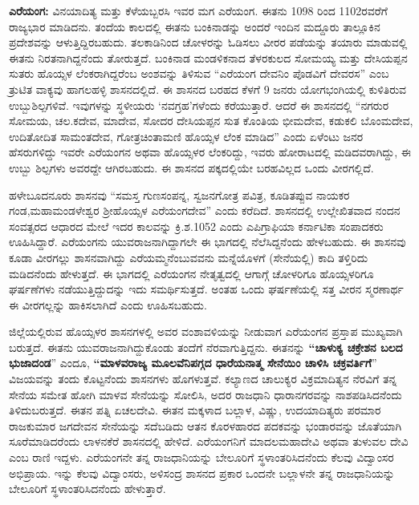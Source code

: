 \textbf{ಎರೆಯಂಗ:} ವಿನಯಾದಿತ್ಯ ಮತ್ತು ಕೆಳೆಯಬ್ಬರಸಿ ಇವರ ಮಗ ಎರೆಯಂಗ. ಈತನು 1098 ರಿಂದ 1102ರವರೆಗೆ ರಾಜ್ಯಭಾರ ಮಾಡಿದನು. ತಂದೆಯ ಕಾಲದಲ್ಲಿ ಈತನು ಬಂಕಿನಾಡನ್ನು ಅಂದರೆ ಇಂದಿನ ಮದ್ದೂರು ತಾಲ್ಲೂಕಿನ ಪ್ರದೇಶವನ್ನು ಆಳುತ್ತಿದ್ದಿರಬಹುದು. ತಲಕಾಡಿನಿಂದ ಚೋಳರನ್ನು ಓಡಿಸಲು ವೀರರ ಪಡೆಯನ್ನು ತಯಾರು ಮಾಡುವಲ್ಲಿ ಈತನು ನಿರತನಾಗಿದ್ದನೆಂದು ತೋರುತ್ತದೆ. ಬಂಕಿನಾಡ ಮಂಡಳಿಕನಾದ ತೆಳರಕುಲದ ಸೋಮಯ್ಯ ಮತ್ತು ದೇಸಿಯಪ್ಪನ ಸುತರು ಹೊಯ್ಸಳ ಲೆಂಕರಾಗಿದ್ದರೆಂಬ ಅಂಶವನ್ನು ತಿಳಿಸುವ “ಎರೆಯಂಗ ದೇವನಿಂ ಪೊಡವಿಗೆ ದೇವರಸ” ಎಂಬ ತ್ರುಟಿತ ವಾಕ್ಯವು ಹಾಗಲಹಳ್ಳಿ ಶಾಸನದಲ್ಲಿದೆ. ಈ ಶಾಸನದ ಬರಹದ ಕೆಳಗೆ 9 ಜನರು ಯೋಗಭಂಗಿಯಲ್ಲಿ ಕುಳಿತಿರುವ ಉಬ್ಬುಶಿಲ್ಪಗಳಿವೆ. ಇವುಗಳನ್ನು ಸ್ಥಳೀಯರು ‘ನವಗ್ರಹ’ಗಳೆಂದು ಕರೆಯುತ್ತಾರೆ. ಆದರೆ ಈ ಶಾಸನದಲ್ಲಿ “ನಗರುರ ಸೋಮಯ, ಚಲ.ಕದೇವ, ಮಾದೇವ, ಸೋದರ ದೇಸಿಯಪ್ಪನ ಸುತ ಕೊಂತಿಯ ಭೀಮದೇವ, ಕಡುಕಲಿ ಬೊಂಮದೇವ, ಉದಿತೋದಿತ ಸಾಮಂತದೇವ, ಗೋತ್ರಚಿಂತಾಮಣಿ ಹೊಯ್ಸಳ ಲೆಂಕ ಮಾಡಿದ” ಎಂದು ಏಳೆಂಟು ಜನರ ಹೆಸರುಗಳಿದ್ದು ಇವರೇ ಎರೆಯಂಗನ ಅಥವಾ ಹೊಯ್ಸಳರ ಲೆಂಕರಿದ್ದು, ಇವರು ಹೋರಾಟದಲ್ಲಿ ಮಡಿದವರಾಗಿದ್ದು, ಈ ಉಬ್ಬು ಶಿಲ್ಪಗಳು ಅವರದ್ದೇ ಆಗಿರಬಹುದು. ಈ ಶಾಸನದ ಪಕ್ಕದಲ್ಲಿಯೇ ಬರಹವಿಲ್ಲದ ಒಂದು ವೀರಗಲ್ಲಿದೆ. 

ಹಳೇಬೂದನೂರು ಶಾಸನವು “ಸಮಸ್ತ ಗುಣಸಂಪನ್ನ, ಸ್ವಜನಗೋತ್ರ ಪವಿತ್ರ, ಕೂಡಿತಪ್ಪುವ ನಾಯಕರ ಗಂಡ,\break ಮಹಾಮಂಡಳೇಶ್ವರ ಶ‍್ರೀಹೊಯ್ಸಳ ಎರೆಯಂಗದೇವ” ಎಂದು ಕರೆದಿದೆ. ಶಾಸನದಲ್ಲಿ ಉಲ್ಲೇಖಿತವಾದ ನಂದನ ಸಂವತ್ಸರದ ಆಧಾರದ ಮೇಲೆ ಇದರ ಕಾಲವನ್ನು ಕ್ರಿ.ಶ.1052 ಎಂದು ಎಪಿಗ್ರಾಫಿಯಾ ಕರ್ನಾಟಿಕಾ ಸಂಪಾದಕರು ಊಹಿಸಿದ್ದಾರೆ. ಎರೆಯಂಗನು ಯುವರಾಜನಾಗಿದ್ದಾಗಲೇ ಈ ಭಾಗದಲ್ಲಿ ನೆಲೆಸಿದ್ದನೆಂದು ಹೇಳಬಹುದು. ಈ ಶಾಸನವು ಕೂಡಾ ವೀರಗಲ್ಲು ಶಾಸನವಾಗಿದ್ದು ಎರೆಯಮ್ಮನೆಂಬುವವನು ಮನ್ನೆಯೊಳಗೆ (ಸೇನೆಯಲ್ಲಿ) ಕಾದಿ ತಳ್ತಿರಿದು ಮಡಿದನೆಂದು ಹೇಳುತ್ತದೆ. ಈ ಭಾಗದಲ್ಲಿ ಎರೆಯಂಗನ ನೇತೃತ್ವದಲ್ಲಿ ಆಗಾಗ್ಗೆ ಚೋಳರಿಗೂ ಹೊಯ್ಸಳರಿಗೂ ಘರ್ಷಣೆಗಳು ನಡೆಯುತ್ತಿದ್ದುದನ್ನು ಇದು ಸಮರ್ಥಿಸುತ್ತದೆ. ಅಂತಹ ಒಂದು ಘರ್ಷಣೆಯಲ್ಲಿ ಸತ್ತ ವೀರನ ಸ್ಮರಣಾರ್ಥ ಈ ವೀರಗಲ್ಲನ್ನು ಹಾಕಿಸಲಾಗಿದೆ ಎಂದು ಊಹಿಸಬಹುದು. 

ಜಿಲ್ಲೆಯಲ್ಲಿರುವ ಹೊಯ್ಸಳರ ಶಾಸನಗಳಲ್ಲಿ ಅವರ ವಂಶಾವಳಿಯನ್ನು ನೀಡುವಾಗ ಎರೆಯಂಗನ ಪ್ರಸ್ತಾಪ ಮುಖ್ಯವಾಗಿ ಬರುತ್ತದೆ. ಈತನು ಯುವರಾಜನಾಗಿದ್ದುಕೊಂಡು ತಂದೆಗೆ ನೆರವಾಗುತ್ತಿದ್ದನು. ಈತನನ್ನು \textbf{“ಚಾಳುಕ್ಯ ಚಕ್ರೇಶನ ಬಲದ ಭುಜಾದಂಡ}” ಎಂದೂ,\textbf{ “ಮಾಳವರಾಜ್ಯ ಮೂಲವೆನಿಪಗ್ಗದ ಧಾರೆಯನಾತ್ಮ ಸೇನೆಯಿಂ ಚಾಳಿಸಿ ಚಕ್ರವರ್ತಿಗೆ}” ವಿಜಯವನ್ನು ತಂದು ಕೊಟ್ಟನೆಂದು ಶಾಸನಗಳು ಹೊಗಳುತ್ತವೆ. ಕಲ್ಯಾಣದ ಚಾಲುಕ್ಯರ ವಿಕ್ರಮಾದಿತ್ಯನ ನೆರವಿಗೆ ತನ್ನ ಸೇನೆಯ ಸಮೇತ ಹೋಗಿ ಮಾಳವ ಸೇನೆಯನ್ನು ಸೋಲಿಸಿ, ಅದರ ರಾಜಧಾನಿ ಧಾರಾನಗರವನ್ನು ನಾಶಪಡಿಸಿದನೆಂದು ತಿಳಿದುಬರುತ್ತದೆ. ಈತನ ಪತ್ನಿ ಏಚಲದೇವಿ. ಈತನ ಮಕ್ಕಳಾದ ಬಲ್ಲಾಳ, ವಿಷ್ಣು, ಉದಯಾದಿತ್ಯರು ಪರಮಾರ ರಾಜಕುಮಾರ ಜಗದೇವನ ಸೇನೆಯನ್ನು ಸದೆಬಡಿದು ಆತನ ಕೊರಳಹಾರದ ಪದಕವನ್ನು ಭಂಡಾರವನ್ನು ಜೊತೆಯಾಗಿ ಸೂರೆಮಾಡಿದರೆಂದು ಲಾಳನಕೆರೆ ಶಾಸನದಲ್ಲಿ ಹೇಳಿದೆ. ಎರೆಯಂಗನಿಗೆ ಮಾದಲಮಹಾದೇವಿ ಅಥವಾ ತುಳುವಲ ದೇವಿ ಎಂಬ ರಾಣಿ ಇದ್ದಳು. ಎರೆಯಂಗನೇ ತನ್ನ ರಾಜಧಾನಿಯನ್ನು ಬೇಲೂರಿಗೆ ಸ್ಥಳಾಂತರಿಸಿದನೆಂದು ಕೆಲವು ವಿದ್ವಾಂಸರ ಅಭಿಪ್ರಾಯ. ಇನ್ನು ಕೆಲವು ವಿದ್ವಾಂಸರು, ಅಳಿಸಂದ್ರ ಶಾಸನದ ಪ್ರಕಾರ ಒಂದನೇ ಬಲ್ಲಾಳನೇ ತನ್ನ ರಾಜಧಾನಿಯನ್ನು ಬೇಲೂರಿಗೆ ಸ್ಥಳಾಂತರಿಸಿದನೆಂದು ಹೇಳುತ್ತಾರೆ.



